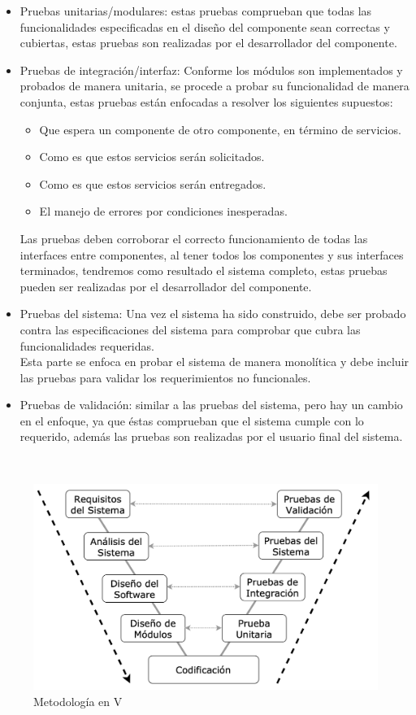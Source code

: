 \begin{itemize}

    \item Pruebas unitarias/modulares: estas pruebas comprueban que todas las funcionalidades especificadas en el diseño del componente sean correctas y cubiertas, estas pruebas son realizadas por el desarrollador del componente.
    
    \item Pruebas de integración/interfaz:
    Conforme los módulos son implementados y probados de manera unitaria, se procede a probar su funcionalidad de manera conjunta, estas pruebas están enfocadas a resolver los siguientes supuestos:
    
    \begin{itemize}
        \item Que espera un componente de otro componente, en término de servicios.
        \item Como es que estos servicios serán solicitados.
        \item Como es que estos servicios serán entregados.
        \item El manejo de errores por condiciones inesperadas.
    \end{itemize}
    
    Las pruebas deben corroborar el correcto funcionamiento de todas las interfaces entre componentes, al tener todos los componentes y sus interfaces terminados, tendremos como resultado el sistema completo, estas pruebas pueden ser realizadas por el desarrollador del componente.
    
    \item Pruebas del sistema: Una vez el sistema ha sido construido, debe ser probado contra las especificaciones del sistema para comprobar que cubra las funcionalidades requeridas.\\
    Esta parte se enfoca en probar el sistema de manera monolítica y debe incluir las pruebas para validar los requerimientos no funcionales.

    \item Pruebas de validación: similar a las pruebas del sistema, pero hay un cambio en el enfoque, ya que éstas comprueban que el sistema cumple con lo requerido, además las pruebas son realizadas por el usuario final del sistema.

\end{itemize}

\\
\begin{figure}[H]
	\centering
	\includegraphics[scale=.4]{Capitulo3/img/vmodel.png}
	\caption{Metodología en V}
	\label{fig:ModeloIncremental}
\end{figure}

